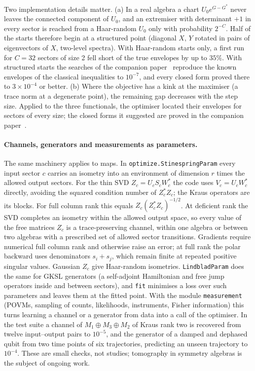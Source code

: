 \documentclass[11pt]{article}
\begin{document}
Two implementation details matter. (a) In a real algebra a chart $U_0e^{G-G^*}$ never leaves the connected component of
$U_0$, and an extremiser with determinant $+1$ in every sector is reached from a Haar-random $U_0$ only with probability
$2^{-C}$. Half of the starts therefore begin at a structured point (diagonal $X$, $Y$ rotated in pairs of eigenvectors of
$X$, two-level spectra). With Haar-random starts only, a first run for $C=32$ sectors of size 2 fell short of the true
envelopes by up to $35\%$. With structured starts the searches of the companion paper~\cite{nn_trace} reproduce the
known envelopes of the classical inequalities to $10^{-7}$, and every closed form proved there to $3\times10^{-4}$ or better. (b) Where the
objective has a kink at the maximiser (a trace norm at a degenerate point), the remaining gap decreases with the step
size. Applied to the three functionals, the optimiser located their envelopes for sectors of every size; the closed
forms it suggested are proved in the companion paper~\cite{nn_trace}.

\paragraph{Channels, generators and measurements as parameters.} The same machinery applies to maps. In
\texttt{optimize.StinespringParam} every input sector $c$ carries an isometry into an
environment of dimension $r$ times the allowed output sectors. For the thin SVD $Z_c=U_cS_cW_c^*$ the code uses
$V_c=U_cW_c^*$ directly, avoiding the squared condition number of $Z_c^*Z_c$; the Kraus operators are its blocks.
For full column rank this equals $Z_c(Z_c^*Z_c)^{-1/2}$. At deficient rank the SVD completes an isometry within the
allowed output space, so every value of the free
matrices $Z_c$ is a trace-preserving channel, within one algebra or between two algebras with a prescribed set of
allowed sector transitions. Gradients require numerical full column rank and otherwise raise an error; at full rank
the polar backward uses denominators $s_i+s_j$, which remain finite at repeated positive singular values.
Gaussian $Z_c$ give Haar-random isometries. \texttt{LindbladParam} does the same for
GKSL generators (a self-adjoint Hamiltonian and free jump operators inside and between sectors), and \texttt{fit}
minimises a loss over such parameters and leaves them at the fitted point. With the module \texttt{measurement}
(POVMs, sampling of counts, likelihoods, instruments, Fisher information) this turns learning a channel or a
generator from data into a call of the optimiser. In the test suite a channel of $M_1\oplus M_3\oplus M_2$ of Kraus
rank two is recovered from twelve input--output pairs to $10^{-5}$, and the generator of a damped and dephased qubit
from two time points of six trajectories, predicting an unseen trajectory to $10^{-4}$. These are small checks, not
studies; tomography in symmetry algebras is the subject of ongoing work.
\end{document}
